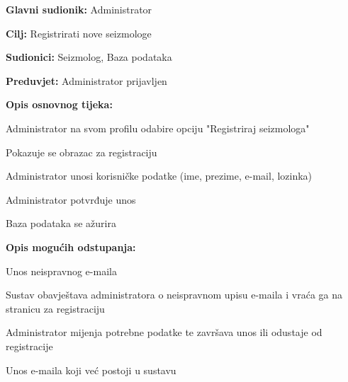 					\noindent {}
					\begin{packed_item}
	
						\item \textbf{Glavni sudionik:} Administrator
						\item \textbf{Cilj:} Registrirati nove seizmologe
						\item \textbf{Sudionici:} Seizmolog, Baza podataka
						\item \textbf{Preduvjet:} Administrator prijavljen
						\item \textbf{Opis osnovnog tijeka:}
						
						\item[] \begin{packed_enum}
	
							\item Administrator na svom profilu odabire opciju "Registriraj seizmologa"
							\item Pokazuje se obrazac za registraciju
							\item Administrator unosi korisničke podatke (ime, prezime, e-mail, lozinka)
							\item Administrator potvrđuje unos
							\item Baza podataka se ažurira
						
						\end{packed_enum}
						
						\item  \textbf{Opis mogućih odstupanja:}
						
						\item[] \begin{packed_item}
	
							\item[3.a] Unos neispravnog e-maila
							\item[] \begin{packed_enum}
								
								\item Sustav obavještava administratora o neispravnom upisu e-maila i vraća ga na stranicu za registraciju
								\item Administrator mijenja potrebne podatke te završava unos ili odustaje od registracije
								\end{packed_enum}
							\item[3.b] Unos e-maila koji već postoji u sustavu
								\item[] \begin{packed_enum}
									

\end{packed_enum}
\end{packed_item}
\end{packed_item}
